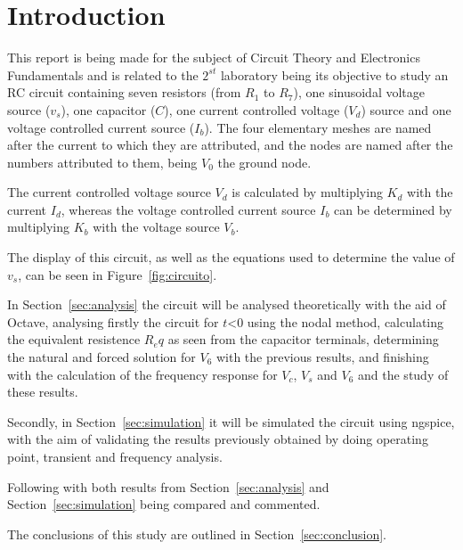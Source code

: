 \section{Introduction}
\label{sec:introduction}


\hspace{0,5cm} This report is being made for the subject of Circuit Theory and Electronics Fundamentals and is related to the $2^{st}$ laboratory being its objective to study an RC circuit containing seven resistors (from $R_1$ to $R_7$), one sinusoidal voltage source ($v_s$), one capacitor ($C$), one current controlled voltage ($V_d$) source and one voltage controlled current source ($I_b$). The four elementary meshes are named after the current to which they are attributed, and the nodes are named after the numbers attributed to them, being $V_0$ the ground node.

The current controlled voltage source $V_d$ is calculated by multiplying $K_d$ with the current $I_d$, whereas the voltage controlled current source $I_b$ can be determined by multiplying $K_b$ with the voltage source $V_b$.

The display of this circuit, as well as the equations used to determine the value of $v_s$, can be seen in Figure~\ref{fig:circuito}.

In Section~\ref{sec:analysis} the circuit will be analysed theoretically with the aid of Octave, analysing firstly the circuit for $t$<0 using the nodal method, calculating the equivalent resistence $R_eq$ as seen from the capacitor terminals, determining the natural and forced solution for $V_6$ with the previous results, and finishing with the calculation of the frequency response for $V_c$, $V_s$ and $V_6$ and the study of these results.

Secondly, in Section~\ref{sec:simulation} it will be simulated the circuit using ngspice, with the aim of validating the results previously obtained by doing operating point, transient and frequency analysis.

Following with both results from Section~\ref{sec:analysis} and Section~\ref{sec:simulation} being compared and commented.

The conclusions of this study are outlined in Section~\ref{sec:conclusion}.

